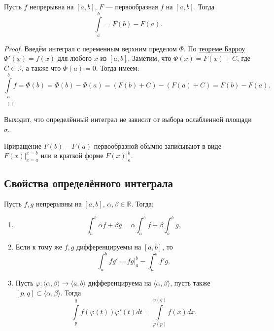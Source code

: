 \hypertarget{t9}{}
\begin{theorem}
	Пусть $f$ непрерывна на $[a, b]$, $F$ --- первообразная $f$ на $[a, b]$. Тогда \[
		\int\limits_a^b = F(b) - F(a).
	\]
\end{theorem}
\begin{proof}
	Введём интеграл с переменным верхним пределом $\Phi$. По \hyperlink{t8}{теореме Барроу} $\Phi'(x) = f(x)$ для любого $x$ из $[a, b]$.
	Заметим, что $\Phi(x) = F(x) + C$, где $C \in \mathbb{R}$, а также что $\Phi(a) = 0$. Тогда имеем: \[
		\int\limits_a^b f = \Phi(b) = \Phi(b) - \Phi(a) = (F(b) + C) - (F(a) + C) = F(b) - F(a). 
	\]
\end{proof}

\begin{remark}
	Выходит, что определённый интеграл не зависит от выбора ослабленной площади $\sigma$.
\end{remark}

\begin{remark}
	Приращение $F(b) - F(a)$ первообразной обычно записывают в виде $F(x) \bigg|_{x = a}^{x = b}$ или в краткой форме $F(x) \bigg|_a^b$.
\end{remark}

\subsection{Свойства определённого интеграла}

\begin{theorem}
	Пусть $f, g$ непрерывны на $[a, b]$, $\alpha, \beta \in \mathbb{R}$. Тогда:
	\begin{enumerate}
		\item \[
			\int_a^b \alpha f + \beta g = \alpha \int_a^b f + \beta \int_a^b g,
		\]
		\item Если к тому же $f, g$ дифференцируемы на $[a, b]$, то \[
			\int_a^b fg' = fg \bigg|_a^b - \int_a^b f'g,
		\]
		\item Пусть $\varphi: \langle \alpha, \beta \rangle \to \langle a, b \rangle$ дифференцируема на $\langle \alpha, \beta \rangle$,
		пусть также $[p, q] \subset \langle \alpha, \beta \rangle$. Тогда \[
			\int\limits_p^q f(\varphi(t))\varphi'(t) dt = \int\limits_{\varphi(p)}^{\varphi(q)} f(x) dx.
		\]
	\end{enumerate}
\end{theorem}

